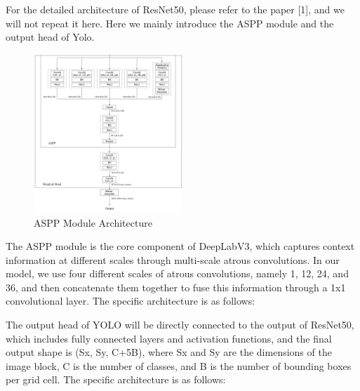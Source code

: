 \documentclass[conference]{IEEEtran}
\begin{document}

For the detailed architecture of ResNet50, please refer to the paper [1], and we will not repeat it here. Here we mainly introduce the ASPP module and the output head of Yolo.

\begin{figure}[htbp]
    \centering
    \centerline{\includegraphics[width=0.5\textwidth]{fig/aspp.png}}
    \caption{ASPP Module Architecture}
    \label{fig:aspp}
\end{figure}


The ASPP module is the core component of DeepLabV3, which captures context information at different scales through multi-scale atrous convolutions. In our model, we use four different scales of atrous convolutions, namely 1, 12, 24, and 36, and then concatenate them together to fuse this information through a 1x1 convolutional layer. The specific architecture is as follows:


The output head of YOLO will be directly connected to the output of ResNet50, which includes fully connected layers and activation functions, and the final output shape is (Sx, Sy, C+5B), where Sx and Sy are the dimensions of the image block, C is the number of classes, and B is the number of bounding boxes per grid cell. The specific architecture is as follows:
\end{document}
